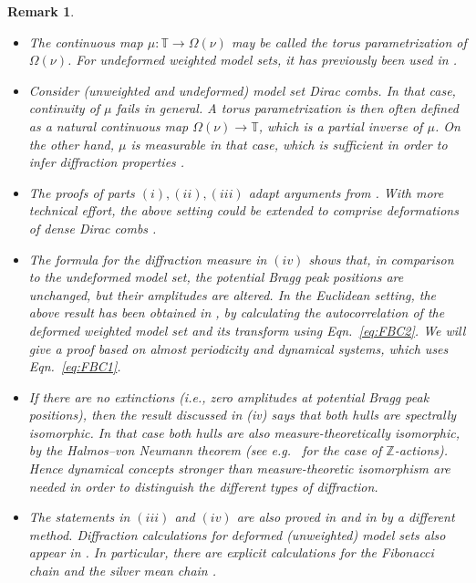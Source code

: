 \documentclass[11pt, a4wide]{amsart}
\newcommand{\TT}{\mathbb{T}}
\newtheorem{remark}[lemma]{Remark}
\numberwithin{lemma}{section}
\begin{document}
\begin{remark}
\begin{itemize}
\item [(i)] The continuous map $\mu:\TT\to \Omega(\nu)$ may be called the torus parametrization of $\Omega(\nu)$. For undeformed weighted model sets, it has previously been used in \cite{LR}.
\item [(ii)] Consider (unweighted and undeformed) model set Dirac combs. In that case,  continuity of $\mu$ fails in general. A torus parametrization is then often defined as a natural continuous map  $\Omega(\nu)\to\TT$, which is a partial inverse of $\mu$.
On the other hand, $\mu$ is measurable in that case, which is sufficient in order to infer diffraction properties \cite{KR,KR17}.

\item[(iii)] The proofs of parts $(i), (ii), (iii)$ adapt arguments from \cite[Sec.~7]{LR}. With more technical effort, the above setting could be extended to comprise deformations of dense Dirac combs \cite{LR}.

\item[(iv)] The formula for the diffraction measure in $(iv)$ shows that, in comparison to the undeformed model set, the potential Bragg peak positions are unchanged, but their amplitudes are altered. In the Euclidean setting, the above result has been obtained in \cite{BD}, by calculating the autocorrelation of the deformed weighted model set and its transform using Eqn.~\eqref{eq:FBC2}. We will give a proof based on almost periodicity and dynamical systems, which uses Eqn.~\eqref{eq:FBC1}. 

\item[(v)]  If there are no extinctions (i.e., zero amplitudes at potential Bragg peak positions), then the result discussed in (iv) says that both hulls are spectrally isomorphic. In that case both hulls are also measure-theoretically isomorphic, by the Halmos--von Neumann theorem (see e.g.~\cite{Wal} for the case of $\mathbb Z$-actions). Hence dynamical concepts  stronger than measure-theoretic isomorphism are needed in order to distinguish the different types of diffraction.



\item[(vi)] The statements in $(iii)$ and $(iv)$ are also proved in \cite[Thm.~6]{BL2} and in \cite[Sec.~7.1]{Len} by a different method. Diffraction calculations for deformed (unweighted) model sets also appear in \cite{BD,BL2}. In particular, there are explicit calculations for the Fibonacci chain \cite[Sec.~5]{BD} and the silver mean chain \cite[Sec.~7]{BL2}.

\end{itemize}

\end{remark}
\end{document}
